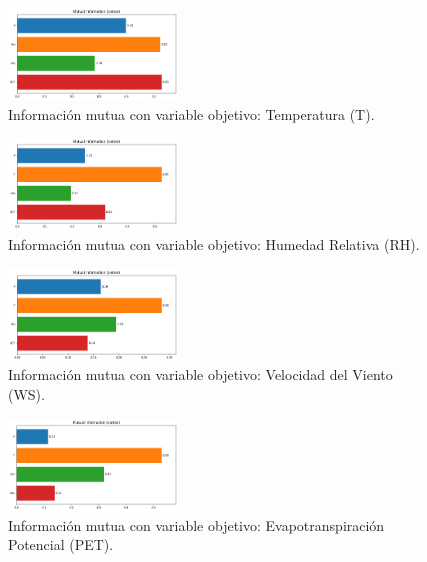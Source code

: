 \begin{figure}[H]
    \centering
    \includegraphics[width=0.4\textwidth]{resultados/global/bivariado/mutual_info_T.png}
    \caption{Información mutua con variable objetivo: Temperatura (T).}
    \label{fig:mutual_info_T}
\end{figure}

\begin{figure}[H]
    \centering
    \includegraphics[width=0.4\textwidth]{resultados/global/bivariado/mutual_info_RH.png}
    \caption{Información mutua con variable objetivo: Humedad Relativa (RH).}
    \label{fig:mutual_info_RH}
\end{figure}

\begin{figure}[H]
    \centering
    \includegraphics[width=0.4\textwidth]{resultados/global/bivariado/mutual_info_WS.png}
    \caption{Información mutua con variable objetivo: Velocidad del Viento (WS).}
    \label{fig:mutual_info_WS}
\end{figure}

\begin{figure}[H]
    \centering
    \includegraphics[width=0.4\textwidth]{resultados/global/bivariado/mutual_info_PET.png}
    \caption{Información mutua con variable objetivo: Evapotranspiración Potencial (PET).}
    \label{fig:mutual_info_PET}
\end{figure}

